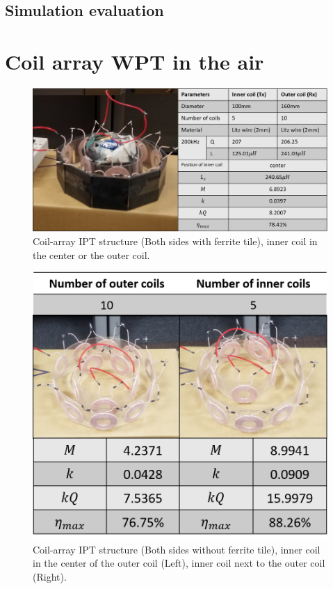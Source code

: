 
\subsection{Simulation evaluation}


\section{Coil array WPT in the air}
\begin{figure}[htbp]
    \centering
    \includegraphics[width=1.0\linewidth]{images/4_coil_5_10_with_ferrite.png}
    \caption{Coil-array IPT structure (Both sides with ferrite tile), inner coil in the center or the outer coil.}
\end{figure}
\begin{figure}[htbp]
    \centering
    \includegraphics[width=0.6\linewidth]{images/4_coil_5_10_without_ferrite.png}
    \caption{Coil-array IPT structure (Both sides without ferrite tile), inner coil in the center of the outer coil (Left), inner coil next to the outer coil (Right).}
\end{figure}
